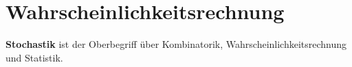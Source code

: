 \part{Wahrscheinlichkeitsrechnung}

\textbf{Stochastik} ist der Oberbegriff über
Kombinatorik, Wahrscheinlichkeitsrechnung und Statistik.

\renewcommand{\bbwPartID}{STOCH}






\newpage
